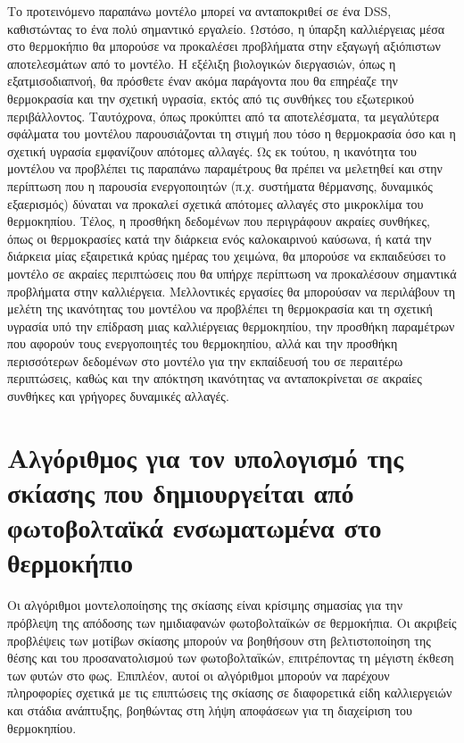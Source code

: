 \documentclass[12pt, a4paper]{report} %
\newcommand{\english}{\foreignlanguage{english}}
\begin{document}
Το προτεινόμενο παραπάνω μοντέλο μπορεί να ανταποκριθεί σε ένα \english{DSS}, καθιστώντας το ένα πολύ σημαντικό 
εργαλείο. Ωστόσο, η ύπαρξη καλλιέργειας μέσα στο θερμοκήπιο θα μπορού\-σε να προκαλέσει προβλήματα στην εξαγωγή 
αξιόπιστων αποτελεσμάτων από το μοντέλο. Η εξέλιξη βιολογικών διεργασιών, όπως η εξατμισοδιαπνοή, θα πρόσθετε έναν 
ακόμα παράγοντα που θα επηρέαζε την θερμοκρασία και την σχετική υγρασία, εκτός από τις συνθήκες του εξωτερικού 
περιβάλλοντος. Ταυτόχρονα, όπως προκύπτει από τα αποτελέσματα, τα μεγαλύτερα σφάλματα του μοντέλου παρουσιάζονται τη 
στιγμή που τόσο η θερμοκρασία όσο και η σχετική υγρασία εμφανίζουν απότομες αλλαγές. Ως εκ τούτου, η ικανότητα του 
μοντέλου να προβλέπει τις παραπάνω παραμέτρους θα πρέπει να μελετηθεί και στην περίπτωση που η παρουσία ενεργοποιητών 
(π.χ. συστήματα θέρμανσης, δυναμικός εξαερισμός) δύναται να προκαλεί σχετικά απότομες αλλαγές στο μικροκλίμα του 
θερμοκηπίου. Τέλος, η προσθήκη δεδομένων που περιγράφουν ακραίες συνθήκες, όπως οι θερμοκρασίες κατά την διάρκεια ενός 
καλοκαιρινού καύσωνα, ή κατά την διάρκεια μίας εξαιρετικά κρύας ημέρας του χειμώνα, θα μπορούσε να εκπαιδεύσει το 
μοντέλο σε ακραίες περιπτώσεις που θα υπήρχε περίπτωση να προκαλέσουν σημαντικά προβλήματα στην καλλιέργεια. Μελλοντικές 
εργασίες θα μπορούσαν να περιλάβουν τη μελέτη της ικανότητας του μοντέλου να προβλέπει τη θερμοκρασία και τη σχετική 
υγρασία υπό την επίδραση μιας καλλιέργειας θερμοκηπίου, την προσθήκη παραμέτρων που αφορούν τους ενεργοποιητές του 
θερμοκηπίου, αλλά και την προσθήκη περισσότερων δεδομένων στο μοντέλο για την εκπαίδευσή του σε περαιτέρω περιπτώσεις, 
καθώς και την απόκτηση ικανότητας να ανταποκρίνεται σε ακραίες συνθήκες και γρήγορες δυναμικές αλλαγές.

\newpage
\vspace*{6.5cm}
\sloppy
\section{Αλγόριθμος για τον υπολογισμό της σκίασης που δημιουργείται από φωτοβολταϊκά ενσωματωμένα στο 
θερμοκήπιο}\label{sec_algorithm}
\fussy

Οι αλγόριθμοι μοντελοποίησης της σκίασης είναι κρίσιμης σημασίας για την πρόβλεψη της απόδοσης των ημιδιαφανών 
φωτοβολταϊκών σε θερμοκήπια. Οι ακριβείς προβλέψεις των μοτίβων σκίασης μπορούν να βοηθήσουν στη βελτιστοποίηση 
της θέσης και του προσανατολισμού των φωτοβολταϊκών, επιτρέποντας τη μέγιστη έκθεση των φυτών στο φως. Επιπλέον, 
αυτοί οι αλγόριθμοι μπορούν να παρέχουν πληροφορίες σχετικά με τις επιπτώσεις της σκίασης σε διαφορετικά είδη 
καλλιεργειών και στάδια ανάπτυξης, βοηθώντας στη λήψη αποφάσεων για τη διαχείριση του θερμοκηπίου.
\end{document}
